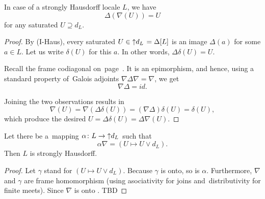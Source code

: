 \begin{lem} \label{meets-in-satur}
  In case of a strongly Hausdorff locale $L$, we have
  \[
    \Delta(\nabla(U)) = U
  \]
  for any saturated $U \supseteq d_L$.
\end{lem}
\begin{proof}
  By (I-Haus), every saturated $U\in \left\uparrow d_L \right. = \Delta[L]$ is
  an image $\Delta(a)$ for some $a\in L$.
  Let us write $\delta(U)$ for this $a$.
  In other words, $\Delta\delta(U) = U$.

  Recall the frame codiagonal on~page~\pageref{codiag-in-Frm}\thinspace.
  It is an epimorphism, and hence, using a standard property of~Galois adjoints
  $\nabla \Delta \nabla = \nabla$, we get
  \[
    \nabla \Delta = id.
  \]

  Joining the two observations results in
  \[
    \nabla (U) = \nabla (\Delta\delta (U)) = (\nabla \Delta)\delta (U) = \delta(U),
  \]
  which produce the desired $U = \Delta \delta (U) = \Delta \nabla (U)$.
\end{proof}

\begin{lem} \label{lem:mapping->IHaus}
  Let there be a~mapping $\alpha\colon L \to \left\uparrow d_L \right.$ such that
  \[
    \alpha \nabla = (U \mapsto U \vee d_L).
  \]
  Then $L$ is strongly Hausdorff.
\end{lem}
\begin{proof}
  Let $\gamma$ stand for $(U \mapsto U \vee d_L)$.
  Because $\gamma$ is onto, so is $\alpha$.
  Furthermore, $\nabla$ and $\gamma$ are frame homomorphism (using asociativity
  for joins and~distributivity for finite meets).
  Since $\nabla$ is onto .
  TBD
\end{proof}


